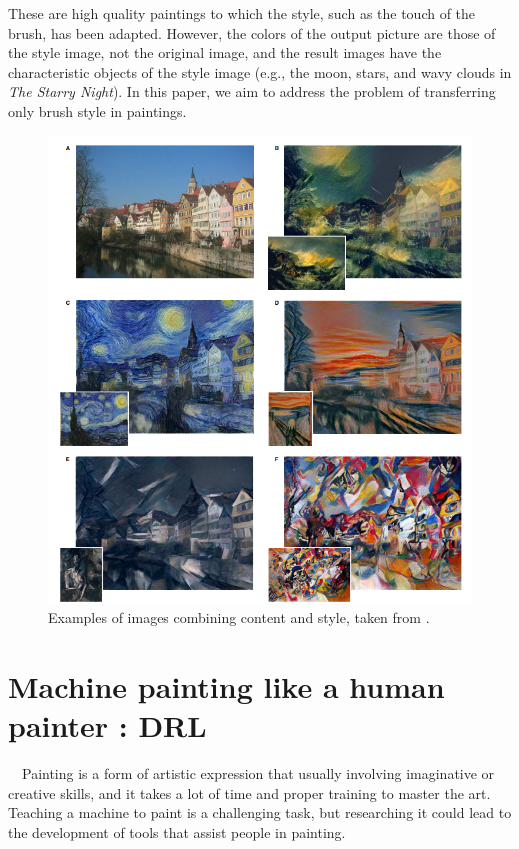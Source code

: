These are high quality paintings to which the style, such as the touch of the 
brush, has been adapted. 
However, the colors of the output picture are those of the style image, 
not the original image, and the result images have the characteristic objects of 
the style image (e.g., the moon, stars, and wavy clouds in \textit{The Starry Night}).
In this paper, we aim to address the problem of transferring only brush style 
in paintings.

\begin{figure}[p]
    \centering
    \includegraphics[width=130truemm]{resources/3_related_work/outputs_IST.png}
    \caption{
        Examples of images combining content and style, taken from
        \cite{Gatys_2016_CVPR}. 
    }
    \label{output_IST}
\end{figure}
\clearpage

\section{Machine painting like a human painter : DRL}
　Painting is a form of artistic expression that usually involving imaginative or 
creative skills, and it takes a lot of time and proper training to master the 
art.  Teaching a machine to paint is a challenging task, but researching it 
could lead to the development of tools that assist people in painting.

